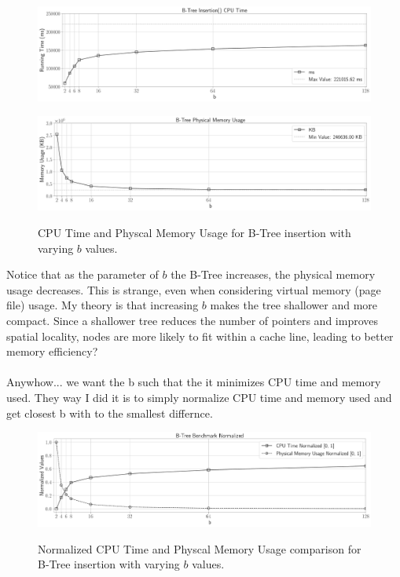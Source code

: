 \documentclass[12pt]{article}
\begin{document}
\begin{figure}[H]
	\centering
	\begin{minipage}{0.5\textwidth}
		\centering
		\includegraphics[width=\linewidth]{../notebook/b-tree_insertion()_cpu_time.pdf}
		\label{fig:cpu_time}
	\end{minipage}\hfill
	\begin{minipage}{0.5\textwidth}
		\centering
		\includegraphics[width=\linewidth]{../notebook/b-tree_physical_memory_usage.pdf}
		\label{fig:physical_memory}
	\end{minipage}\hfill
	\caption{CPU Time and Physcal Memory Usage for B-Tree insertion with varying $b$ values.}
\end{figure}

Notice that as the parameter of $b$ the B-Tree increases, the physical memory usage decreases. This is strange, even when considering virtual memory (page file) usage. My theory is that increasing $b$ makes the tree shallower and more compact. Since a shallower tree reduces the number of pointers and improves spatial locality, nodes are more likely to fit within a cache line, leading to better memory efficiency?
\\\\
Anywhow... we want the b such that the it minimizes CPU time and memory used. They way I did it is to simply normalize CPU time and memory used and get closest b with to the smallest differnce. 

\begin{figure}[H]
	\centering
	\begin{minipage}{1\textwidth}
		\centering
		\includegraphics[width=\linewidth]{../notebook/b-tree_benchmark_normalized.pdf}
		\label{fig:benchmark_normalized}
	\end{minipage}
	\caption{Normalized CPU Time and Physcal Memory Usage comparison for B-Tree insertion with varying $b$ values.}
\end{figure}
\end{document}
